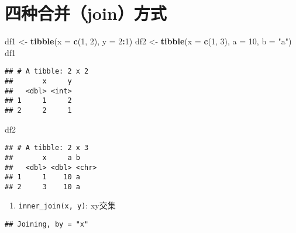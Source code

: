 \documentclass[
]{article}
\newenvironment{Shaded}{\begin{snugshade}}{\end{snugshade}}
\newcommand{\DataTypeTok}[1]{\textcolor[rgb]{0.13,0.29,0.53}{#1}}
\newcommand{\DecValTok}[1]{\textcolor[rgb]{0.00,0.00,0.81}{#1}}
\newcommand{\KeywordTok}[1]{\textcolor[rgb]{0.13,0.29,0.53}{\textbf{#1}}}
\newcommand{\NormalTok}[1]{#1}
\newcommand{\OperatorTok}[1]{\textcolor[rgb]{0.81,0.36,0.00}{\textbf{#1}}}
\newcommand{\StringTok}[1]{\textcolor[rgb]{0.31,0.60,0.02}{#1}}
\providecommand{\tightlist}{%
  \setlength{\itemsep}{0pt}\setlength{\parskip}{0pt}}
\begin{document}
\hypertarget{ux56dbux79cdux5408ux5e76joinux65b9ux5f0f}{%
\section{四种合并（join）方式}\label{ux56dbux79cdux5408ux5e76joinux65b9ux5f0f}}

\begin{Shaded}
\begin{Highlighting}[]
\NormalTok{df1 <-}\StringTok{ }\KeywordTok{tibble}\NormalTok{(}\DataTypeTok{x =} \KeywordTok{c}\NormalTok{(}\DecValTok{1}\NormalTok{, }\DecValTok{2}\NormalTok{), }\DataTypeTok{y =} \DecValTok{2}\OperatorTok{:}\DecValTok{1}\NormalTok{)}
\NormalTok{df2 <-}\StringTok{ }\KeywordTok{tibble}\NormalTok{(}\DataTypeTok{x =} \KeywordTok{c}\NormalTok{(}\DecValTok{1}\NormalTok{, }\DecValTok{3}\NormalTok{), }\DataTypeTok{a =} \DecValTok{10}\NormalTok{, }\DataTypeTok{b =} \StringTok{"a"}\NormalTok{)}
\NormalTok{df1}
\end{Highlighting}
\end{Shaded}

\begin{verbatim}
## # A tibble: 2 x 2
##       x     y
##   <dbl> <int>
## 1     1     2
## 2     2     1
\end{verbatim}

\begin{Shaded}
\begin{Highlighting}[]
\NormalTok{df2}
\end{Highlighting}
\end{Shaded}

\begin{verbatim}
## # A tibble: 2 x 3
##       x     a b    
##   <dbl> <dbl> <chr>
## 1     1    10 a    
## 2     3    10 a
\end{verbatim}

\begin{enumerate}
\def\labelenumi{\arabic{enumi}.}
\tightlist
\item
  \texttt{inner\_join(x,\ y)}: xy交集
\end{enumerate}

\begin{Shaded}
\end{Shaded}

\begin{verbatim}
## Joining, by = "x"
\end{verbatim}
\end{document}
